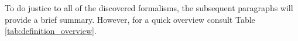 \documentclass[11pt,a4paper]{book}
\theoremstyle{definition}
\theoremstyle{definition}
\theoremstyle{definition}
\theoremstyle{remark}
\newcommand{\prset}{S_{A}}
\newcommand{\butfor}{\texttt{But-For}\,}
\newcommand{\crf}{\texttt{CRF}\,}
\newcommand{\inus}{\texttt{INUS}\,}
\newcommand{\ness}{\texttt{NESS}\,}
\newcommand{\hitch}{\texttt{Hitch-01}\,}
\newcommand{\hpo}{\texttt{HP-01}\,}
\newcommand{\wood}{\texttt{Wood-03}\,}
\newcommand{\hallp}{\texttt{Hall-04p}\,}
\newcommand{\halld}{\texttt{Hall-04d}\,}
\newcommand{\hpu}{\texttt{HP-05}\,}
\newcommand{\hall}{\texttt{Hall-07}\,}
\newcommand{\hpud}{\texttt{HP-05d}\,}
\newcommand{\simple}{\texttt{Simple}\,}
\newcommand{\simplej}{\texttt{SimpleJ}\,}
\newcommand{\pap}{\texttt{PAP}\,}
\newcommand{\bvo}{\texttt{BV-11}\,}
\newcommand{\bvu}{\texttt{BV-12}\,}
\newcommand{\breg}{\texttt{BReg}\,}
\newcommand{\ptc}{\texttt{PTC}\,}
\newcommand{\hpm}{\texttt{HP-15}\,}
\newcommand{\hhcp}{\texttt{HH-CP}\,}
\newcommand{\hpuc}{\texttt{HP-05c}\,}
\newcommand{\hpup}{\texttt{HP-05p}\,}
\newcommand{\hmm}{\texttt{HmM}\,}
\newcommand{\mbm}{\texttt{MbM}\,}
\newcommand{\bvcm}{\texttt{BV-CM}\,}
\newcommand{\bci}{\texttt{BCI}\,}
\newcommand{\scacc}{\texttt{SC-ACC}\,}
\newcommand{\pcps}{\texttt{PCPS}\,}
\newcommand{\at}{\texttt{AT}\,}
\newcommand{\sccf}{\texttt{SC-CF}\,}
\newcommand{\caec}{\texttt{CAEC}\,}
\begin{document}
To do justice to all of the discovered formalisms, the subsequent paragraphs will provide a brief summary. However, for a quick overview consult Table \ref{tab:definition_overview}.

\end{document}
